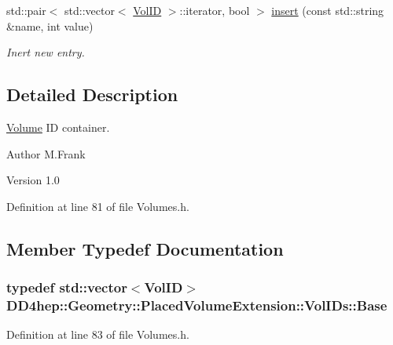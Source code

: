\begin{DoxyCompactItemize}
std::pair$<$ std::vector$<$ \hyperlink{class_d_d4hep_1_1_geometry_1_1_placed_volume_extension_a9f0e95dedfbda206b118af985b2ed473}{VolID} $>$::iterator, bool $>$ \hyperlink{class_d_d4hep_1_1_geometry_1_1_placed_volume_extension_1_1_vol_i_ds_a2902573e21128ccbe7ca2ec2b51c89d5}{insert} (const std::string \&name, int value)
\begin{DoxyCompactList}\small\item\em Inert new entry. \item\end{DoxyCompactList}\end{DoxyCompactItemize}


\subsection{Detailed Description}
\hyperlink{class_d_d4hep_1_1_geometry_1_1_volume}{Volume} ID container. \begin{DoxyAuthor}{Author}
M.Frank 
\end{DoxyAuthor}
\begin{DoxyVersion}{Version}
1.0 
\end{DoxyVersion}


Definition at line 81 of file Volumes.h.

\subsection{Member Typedef Documentation}
\hypertarget{class_d_d4hep_1_1_geometry_1_1_placed_volume_extension_1_1_vol_i_ds_a9328d0964ef092fd108679b2ecafd5b7}{
\subsubsection[{Base}]{\setlength{\rightskip}{0pt plus 5cm}typedef std::vector$<${\bf VolID}$>$ {\bf DD4hep::Geometry::PlacedVolumeExtension::VolIDs::Base}}}
\label{class_d_d4hep_1_1_geometry_1_1_placed_volume_extension_1_1_vol_i_ds_a9328d0964ef092fd108679b2ecafd5b7}


Definition at line 83 of file Volumes.h.

